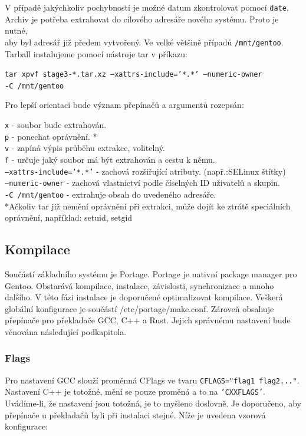 \documentclass[12pt,a4paper,twoside,]{article}
\begin{document}
{V případě jakýchkoliv pochybností je možné datum zkontrolovat pomocí \texttt{date}.
\\Archiv je potřeba extrahovat do cílového adresáře nového systému. Proto je nutné,\\
aby byl adresář již předem vytvořený. Ve velké většině případů \texttt{/mnt/gentoo}.\\
Tarball instalujeme pomocí nástroje tar v příkazu:

\texttt{tar xpvf stage3-*.tar.xz --xattrs-include='*.*' --numeric-owner \\-C /mnt/gentoo}

Pro lepší orientaci bude význam přepínačů a argumentů rozepsán:

\texttt{x} - soubor bude extrahován.\\
\texttt{p} - ponechat oprávnění. *\\
\texttt{v} - zapíná výpis průběhu extrakce, volitelný.\\
\texttt{f} - určuje jaký soubor má být extrahován a cestu k němu.\\
\texttt{--xattrs-include='*.*'} - zachová rozšiřující atributy.
(např.:SELinux štítky)\\
\texttt{--numeric-owner} - zachová vlastnictví podle číselných ID uživatelů a
skupin.\\
\texttt{-C /mnt/gentoo} - extrahuje obsah do uvedeného adresáře.\\

*Ačkoliv tar již nemění oprávnění při extrakci, může dojít ke
ztrátě speciálních oprávnění, například: setuid, setgid

\newpage
\subsection{\textsf{Kompilace}}
Součástí základního systému je Portage. Portage je nativní package manager pro Gentoo.
Obstarává kompilace, instalace, závislosti, synchronizace a mnoho dalšího. V této fázi instalace
je doporučené optimalizovat kompilace. Veškerá globální konfigurace je součástí /etc/portage/make.conf.
Zároveň obsahuje přepínače pro překladače GCC, C++ a Rust. Jejich správnému nastavení bude věnována následující podkapitola.

\subsubsection{\textsf{Flags}}
Pro nastavení GCC slouží proměnná CFlags ve tvaru \texttt{CFLAGS="flag1 flag2..."}. Nastavení C++ je totožné, mění se pouze proměná a to na \texttt{'CXXFLAGS'}.
Uvádíme-li, že nastavení jsou totožná, je to myšleno doslovně. Je doporučeno, aby přepínače u překladačů byli při instalaci stejné. Níže je uvedena
vzorová konfigurace:

}
\end{document}
